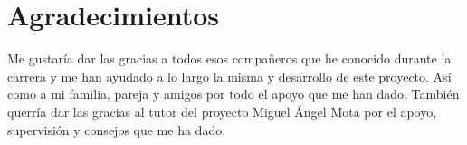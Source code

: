 \section*{Agradecimientos}

Me gustaría dar las gracias a todos esos compañeros que he conocido durante la carrera y me han
ayudado a lo largo la misma y desarrollo de este proyecto. Así como a mi familia, pareja y amigos por
todo el apoyo que me han dado. También querría dar las gracias al tutor del proyecto Miguel Ángel Mota
por el apoyo, supervisión y consejos que me ha dado.
